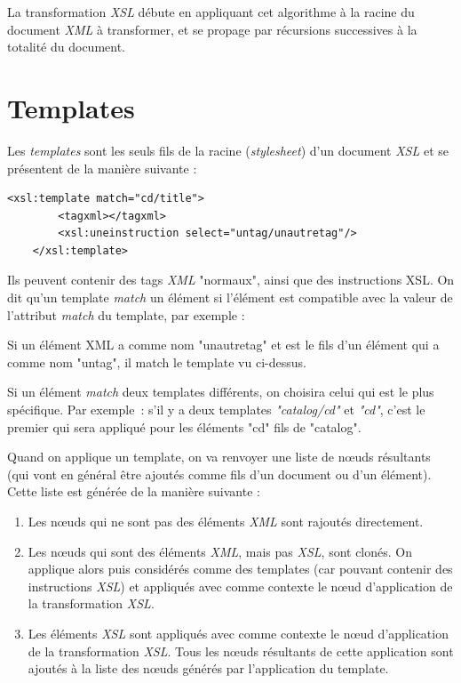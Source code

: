 La transformation \textit{XSL} débute en appliquant cet algorithme à la racine du document \textit{XML} à transformer, et se propage par récursions successives
à la totalité du document.

\section{Templates}

Les \textit{templates} sont les seuls fils de la racine (\textit{stylesheet}) d'un document \textit{XSL} et se présentent de la manière suivante :

\begin{lstlisting}[frame=single]
    <xsl:template match="cd/title">
        <tagxml></tagxml>
        <xsl:uneinstruction select="untag/unautretag"/>
    </xsl:template>
\end{lstlisting}

Ils peuvent contenir des tags \textit{XML} "normaux", ainsi que des instructions XSL.
On dit qu'un template \textit{match} un élément si l'élément est compatible avec la valeur de l'attribut \textit{match} du template, par exemple :

Si un élément XML a comme nom "unautretag" et est le fils d'un élément qui a comme nom "untag", il match le template vu ci-dessus.

Si un élément \textit{match} deux templates différents, on choisira celui qui est le plus spécifique.
Par exemple~: s'il y a deux templates \textit{"catalog/cd"} et \textit{"cd"}, c'est le premier qui sera appliqué pour les éléments "cd" fils de "catalog".

Quand on applique un template, on va renvoyer une liste de nœuds résultants (qui vont en général être ajoutés comme fils d'un document ou d'un élément). Cette liste est générée de la manière suivante :\\

\begin{enumerate}
    \item Les nœuds qui ne sont pas des éléments \textit{XML} sont rajoutés directement.
    \item Les nœuds qui sont des éléments \textit{XML}, mais pas \textit{XSL}, sont clonés. On applique alors  puis considérés comme des templates (car pouvant contenir des instructions \textit{XSL}) et appliqués avec comme contexte le nœud d'application de la transformation \textit{XSL}.
    \item Les éléments \textit{XSL} sont appliqués avec comme contexte le nœud d'application de la transformation \textit{XSL}. Tous les nœuds résultants de cette application sont ajoutés à la liste des nœuds générés par l'application du template.
\end{enumerate}

